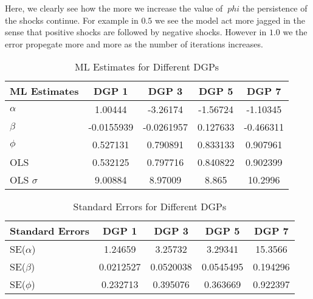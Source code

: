 \documentclass[12pt]{article}
\begin{document}
\begin{figure}[H]
    \centering
    \label{fig:data_plot}
\end{figure}


Here, we clearly see how the more we increase the value of $\   phi$ the 
persistence of the shocks continue. For example in $0.5$ we see the model 
act more jagged in the sense that positive shocks are followed by negative 
shocks. However in $1.0$ we the error propegate more and more as the number 
of iterations increases. 

\begin{table}[H]
    \centering
    \begin{tabular}{lcccc}
        \toprule
        ML Estimates & DGP 1 & DGP 3 & DGP 5 & DGP 7 \\
        \midrule
        $\alpha$ & 1.00444 & -3.26174 & -1.56724 & -1.10345 \\
        $\beta$ & -0.0155939 & -0.0261957 & 0.127633 & -0.466311 \\
        $\phi$ & 0.527131 & 0.790891 & 0.833133 & 0.907961 \\
        \midrule
        OLS & 0.532125 & 0.797716 & 0.840822 & 0.902399 \\
        OLS $\sigma$ & 9.00884 & 8.97009 & 8.865 & 10.2996 \\
        \bottomrule
    \end{tabular}
    \caption{ML Estimates for Different DGPs}
    \label{tab:ml_estimates}
\end{table}

\begin{table}[H]
    \centering
    \begin{tabular}{lcccc}
        \toprule
        Standard Errors & DGP 1 & DGP 3 & DGP 5 & DGP 7 \\
        \midrule
        SE($\alpha$) & 1.24659 & 3.25732 & 3.29341 & 15.3566 \\
        SE($\beta$) & 0.0212527 & 0.0520038 & 0.0545495 & 0.194296 \\
        SE($\phi$) & 0.232713 & 0.395076 & 0.363669 & 0.922397 \\
        \bottomrule
    \end{tabular}
    \caption{Standard Errors for Different DGPs}
    \label{tab:standard_errors}
\end{table}
\end{document}

